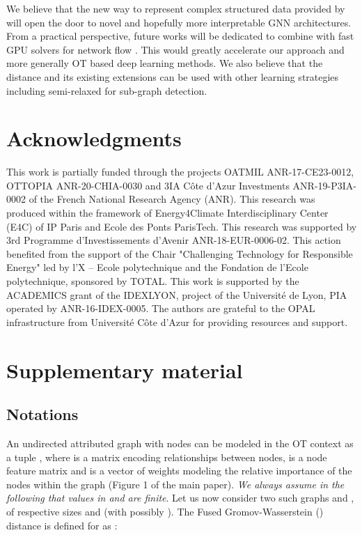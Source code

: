 \documentclass{article}
\begin{document}
{We believe that the new
way to represent complex structured data provided by  will open the door to novel and
hopefully more interpretable GNN architectures. From a practical perspective, future works will be dedicated to combine  with fast GPU solvers for network flow \cite{shekhovtsov2013distributed}. This would greatly accelerate our approach and more generally OT based deep learning methods. We also believe that the  distance and its existing extensions can be used with other learning
strategies including semi-relaxed  \cite{vincent-cuaz2022semirelaxed} for sub-graph detection.

%
 	\label{sec:conclusion}
	
\section*{Acknowledgments}
This work is partially funded through the projects OATMIL ANR-17-CE23-0012, OTTOPIA ANR-20-CHIA-0030 
and 3IA C\^{o}te d'Azur Investments ANR-19-P3IA-0002 of the French National Research
Agency (ANR). This research was produced within the framework of Energy4Climate
Interdisciplinary Center (E4C) of IP Paris and Ecole des Ponts ParisTech. This
research was supported by 3rd Programme d'Investissements d'Avenir
ANR-18-EUR-0006-02. This action benefited from the support of the Chair
"Challenging Technology for Responsible Energy" led by l'X – Ecole polytechnique
and the Fondation de l'Ecole polytechnique, sponsored by TOTAL. This work is supported by the ACADEMICS grant of the IDEXLYON, project of the Université de Lyon, PIA operated by ANR-16-IDEX-0005.
The authors are grateful to the OPAL infrastructure from Universit\'{e} C\^{o}te d'Azur for providing resources and support.

	
	


\section{Supplementary material}
	
\subsection{Notations}\label{subsec:notations}

An undirected attributed graph  with  nodes can be modeled in
the OT context as a tuple , where  is a
matrix encoding relationships between nodes,  is a node feature matrix and  is a vector of
weights modeling the relative importance of the nodes within the graph (Figure
1 of the main paper). \emph{We always assume in the following that values in  and  are finite}. Let us now consider two such graphs 
and , of respective sizes 
and  (with possibly ). The Fused
Gromov-Wasserstein () distance is defined for  as
\cite{vayer2020fused, titouan2019optimal}:

}
\end{document}
